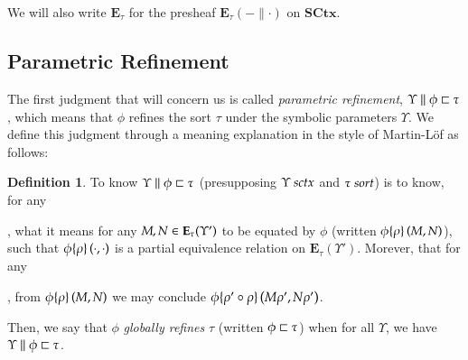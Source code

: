 \documentclass[11pt]{article}
\theoremstyle{definition}
\newtheorem{definition}[thm]{Definition}
\theoremstyle{remark}
\numberwithin{equation}{section}
\def\IModeColorName{MidnightBlue}
\def\OModeColorName{Maroon}
\def\IModeColorName{Black}
\def\OModeColorName{Black}
\newcommand\IMode[1]{{\color{\IModeColorName}{#1}}}
\newcommand\OMode[1]{{\color{\OModeColorName}{#1}}}
\newcommand\Member[2]{\IMode{#1}\in\IMode{#2}}
\newcommand\IsSort[1]{\IMode{#1}\ \textit{sort}}
\newcommand\SCtx{\mathbf{SCtx}}
\newcommand\IsSymCtx[1]{\IMode{#1}\ \textit{sctx}}
\newcommand\Refines[3]{\IMode{#1}\parallel\IMode{#2}\sqsubset\OMode{#3}}
\newcommand\GRefines[2]{\IMode{#1}\sqsubset\OMode{#2}}
\newcommand\Exprs{\mathbf{E}}
\begin{document}
We will also write $\Exprs_\tau$ for the presheaf $\Exprs_\tau(-\parallel\cdot)$ on $\SCtx$.

\subsection{Parametric Refinement}

The first judgment that will concern us is called \emph{parametric refinement},
$\Refines{\Upsilon}{\phi}{\tau}$, which means that $\phi$ refines the sort
$\tau$ under the symbolic parameters $\Upsilon$. We define this judgment
through a meaning explanation in the style of Martin-L\"of as follows:

\newcommand\RefEquate[4]{#1\{\IMode{#2}\}\left(\IMode{#3},\IMode{#4}\right)}

\begin{definition}
  To know $\Refines{\Upsilon}{\phi}{\tau}$ (presupposing $\IsSymCtx{\Upsilon}$
  and $\IsSort{\tau}$) is to know, for any
  ,
  what it means for any $\Member{M,N}{\Exprs_\tau(\Upsilon')}$ to be equated by
  $\phi$ (written $\RefEquate{\phi}{\rho}{M}{N}$), such that
  $\RefEquate{\phi}{\rho}{\cdot}{\cdot}$ is a partial equivalence relation on
  $\Exprs_\tau(\Upsilon')$. Morever, that for any
  ,
  from $\RefEquate{\phi}{\rho}{M}{N}$ we may conclude
  $\RefEquate{\phi}{\rho'\circ\rho}{M\rho'}{N\rho'}$.
\end{definition}

Then, we say that $\phi$ \emph{globally refines} $\tau$ (written
$\GRefines{\phi}{\tau}$) when for all $\Upsilon$, we have
$\Refines{\Upsilon}{\phi}{\tau}$.
\end{document}
